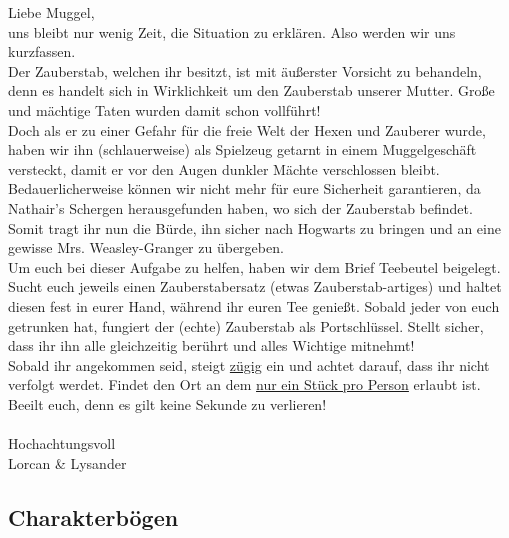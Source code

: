 \documentclass[]{scrartcl}
\begin{document}
{\calligra \large
	
Liebe Muggel,\\

uns bleibt nur wenig Zeit, die Situation zu erklären. Also werden wir uns kurzfassen.\\

Der Zauberstab, welchen ihr besitzt, ist mit äußerster Vorsicht zu behandeln, denn es handelt sich in Wirklichkeit um den Zauberstab unserer Mutter. Große und mächtige Taten wurden damit schon vollführt!\\

Doch als er zu einer Gefahr für die freie Welt der Hexen und Zauberer wurde, haben wir ihn (schlauerweise) als Spielzeug getarnt in einem Muggelgeschäft versteckt, damit er vor den Augen dunkler Mächte verschlossen bleibt. Bedauerlicherweise können wir nicht mehr für eure Sicherheit garantieren, da Nathair’s Schergen herausgefunden haben, wo sich der Zauberstab befindet.\\

Somit tragt ihr nun die Bürde, ihn sicher nach Hogwarts zu bringen und an eine gewisse Mrs. Weasley-Granger zu übergeben.\\

Um euch bei dieser Aufgabe zu helfen, haben wir dem Brief Teebeutel beigelegt. Sucht euch jeweils einen Zauberstabersatz (etwas Zauberstab-artiges) und haltet diesen fest in eurer Hand, während ihr euren Tee genießt. Sobald jeder von euch getrunken hat, fungiert der (echte) Zauberstab als Portschlüssel. Stellt sicher, dass ihr ihn alle gleichzeitig berührt und alles Wichtige mitnehmt!\\

Sobald ihr angekommen seid, steigt \underline{zügig} ein und achtet darauf, dass ihr nicht verfolgt werdet. Findet den Ort an dem \underline{nur ein Stück pro Person} erlaubt ist.\\

Beeilt euch, denn es gilt keine Sekunde zu verlieren!\\

~\\

Hochachtungsvoll\\
Lorcan \& Lysander
}

\newpage

\subsection{Charakterbögen}
\end{document}
